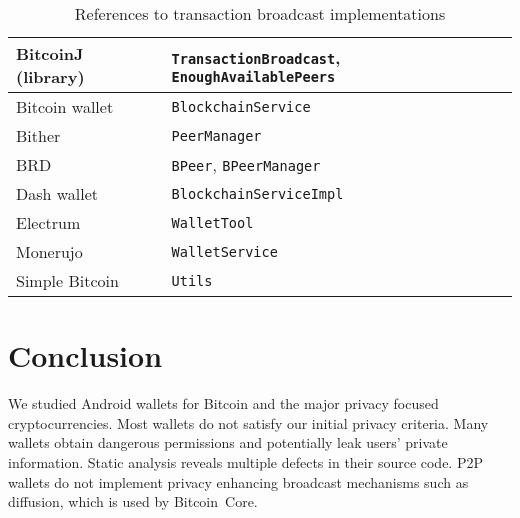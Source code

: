 \begin{table}
	\normalsize
	\caption{References to transaction broadcast implementations}
	\centering
	\begin{tabular}{ | l | l | }
		\hline
		BitcoinJ (library) & \texttt{TransactionBroadcast}, \texttt{EnoughAvailablePeers}  \\
		\hline
		Bitcoin wallet & \texttt{BlockchainService} \\    %
		\hline
		Bither & \texttt{PeerManager} \\    %
		\hline
		BRD & \texttt{BPeer}, \texttt{BPeerManager} \\
		\hline
		Dash wallet & \texttt{BlockchainServiceImpl} \\
		\hline
		Electrum & \texttt{WalletTool} \\
		\hline
		Monerujo & \texttt{WalletService} \\    %
		\hline
		Simple Bitcoin & \texttt{Utils} \\  %
		\hline
	\end{tabular}
	\label{tab:source-code}
\end{table}

\section{Conclusion} \label{section:Ch04Conclusion}

We studied Android wallets for Bitcoin and the major privacy focused cryptocurrencies.
Most wallets do not satisfy our initial privacy criteria.
Many wallets obtain dangerous permissions and potentially leak users' private information.
Static analysis reveals multiple defects in their source code.
P2P wallets do not implement privacy enhancing broadcast mechanisms such as diffusion, which is used by Bitcoin~Core.

